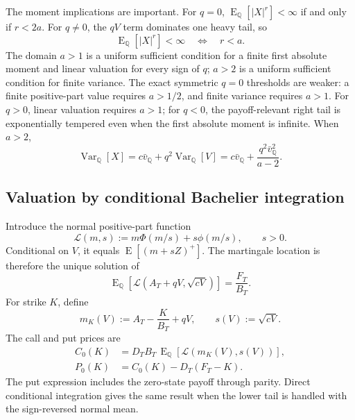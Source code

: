 \documentclass[11pt,a4paper]{article}
\DeclareMathOperator{\Var}{Var}
\DeclareMathOperator{\E}{E}
\begin{document}
The moment implications are important.  For $q=0$,
$\E_{\mathbb Q}[|X|^r]<\infty$ if and only if $r<2a$.  For $q\ne0$, the
$qV$ term dominates one heavy tail, so
\begin{equation}
  \E_{\mathbb Q}[|X|^r]<\infty
  \quad\Longleftrightarrow\quad r<a.
  \label{eq:skew_moment_condition}
\end{equation}
The domain $a>1$ is a uniform sufficient condition for a finite first
absolute moment and linear valuation for every sign of $q$; $a>2$ is a
uniform sufficient condition for finite variance.  The exact symmetric
$q=0$ thresholds are weaker: a finite positive-part value requires
$a>1/2$, and finite variance requires $a>1$.  For $q>0$, linear valuation
requires $a>1$; for $q<0$, the payoff-relevant right tail is exponentially
tempered even when the first absolute moment is infinite.  When $a>2$,
\begin{equation}
  \Var_{\mathbb Q}[X]
  =c\bar v_{\mathbb Q}
   +q^2\Var_{\mathbb Q}[V]
  =c\bar v_{\mathbb Q}
   +\frac{q^2\bar v_{\mathbb Q}^2}{a-2}.
  \label{eq:q_total_variance}
\end{equation}

\subsection{Valuation by conditional Bachelier integration}

Introduce the normal positive-part function
\begin{equation}
  \mathcal L(m,s):=m\Phi(m/s)+s\phi(m/s),\qquad s>0.
  \label{eq:normal_positive_part}
\end{equation}
Conditional on $V$, it equals
$\E[(m+sZ)^+]$.  The martingale location is therefore the unique solution
of
\begin{equation}
  \E_{\mathbb Q}\!\left[
    \mathcal L(A_T+qV,\sqrt{cV})
  \right]
  =\frac{F_T}{B_T}.
  \label{eq:skew_martingale_location}
\end{equation}
For strike $K$, define
\begin{equation}
  m_K(V):=A_T-\frac{K}{B_T}+qV,\qquad
  s(V):=\sqrt{cV}.
\end{equation}
The call and put prices are
\begin{align}
  C_0(K)
  &=D_TB_T\,\E_{\mathbb Q}
    [\mathcal L(m_K(V),s(V))],
  \label{eq:skew_call_price}
  \\
  P_0(K)
  &=C_0(K)-D_T(F_T-K).
  \label{eq:skew_put_price}
\end{align}
The put expression includes the zero-state payoff through parity.  Direct
conditional integration gives the same result when the lower tail is handled
with the sign-reversed normal mean.
\end{document}
